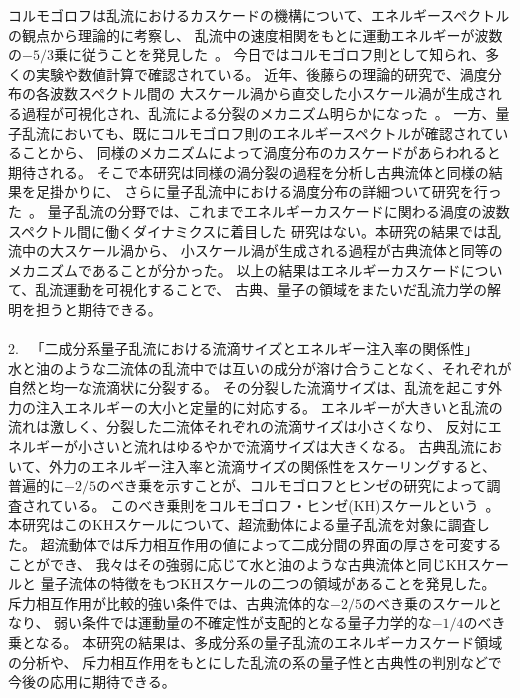 \documentclass[12pt,a4paper]{jbook}
\begin{document}
	コルモゴロフは乱流におけるカスケードの機構について、エネルギースペクトルの観点から理論的に考察し、
    乱流中の速度相関をもとに運動エネルギーが波数の$-5/3$乗に従うことを発見した~\cite{Kolmogorov}。
    今日ではコルモゴロフ則として知られ、多くの実験や数値計算で確認されている。
    近年、後藤らの理論的研究で、渦度分布の各波数スペクトル間の
	大スケール渦から直交した小スケール渦が生成される過程が可視化され、乱流による分裂のメカニズム明らかになった~\cite{Goto1, Goto2, Goto3}。
	一方、量子乱流においても、既にコルモゴロフ則のエネルギースペクトルが確認されていることから、
	同様のメカニズムによって渦度分布のカスケードがあらわれると期待される。
	そこで本研究は同様の渦分裂の過程を分析し古典流体と同様の結果を足掛かりに、
	さらに量子乱流中における渦度分布の詳細ついて研究を行った~\cite{paper1}。
	量子乱流の分野では、これまでエネルギーカスケードに関わる渦度の波数スペクトル間に働くダイナミクスに着目した
	研究はない。本研究の結果では乱流中の大スケール渦から、
	小スケール渦が生成される過程が古典流体と同等のメカニズムであることが分かった。
    以上の結果はエネルギーカスケードについて、乱流運動を可視化することで、
    古典、量子の領域をまたいだ乱流力学の解明を担うと期待できる。
    \\
    \\
	2. \ 「二成分系量子乱流における流滴サイズとエネルギー注入率の関係性」
    \\
    水と油のような二流体の乱流中では互いの成分が溶け合うことなく、それぞれが自然と均一な流滴状に分裂する。
    その分裂した流滴サイズは、乱流を起こす外力の注入エネルギーの大小と定量的に対応する。
    エネルギーが大きいと乱流の流れは激しく、分裂した二流体それぞれの流滴サイズは小さくなり、
    反対にエネルギーが小さいと流れはゆるやかで流滴サイズは大きくなる。
	古典乱流において、外力のエネルギー注入率と流滴サイズの関係性をスケーリングすると、
    普遍的に$-2/5$のべき乗を示すことが、コルモゴロフとヒンゼの研究によって調査されている。
	このべき乗則をコルモゴロフ・ヒンゼ(KH)スケールという~\cite{Kolmogorov49, Hinze}。
	本研究はこのKHスケールについて、超流動体による量子乱流を対象に調査した。
	超流動体では斥力相互作用の値によって二成分間の界面の厚さを可変することができ、
    我々はその強弱に応じて水と油のような古典流体と同じKHスケールと
	量子流体の特徴をもつKHスケールの二つの領域があることを発見した。
	斥力相互作用が比較的強い条件では、古典流体的な$-2/5$のべき乗のスケールとなり、
	弱い条件では運動量の不確定性が支配的となる量子力学的な$-1/4$のべき乗となる。
    本研究の結果は、多成分系の量子乱流のエネルギーカスケード領域の分析や、
	斥力相互作用をもとにした乱流の系の量子性と古典性の判別などで今後の応用に期待できる。
    \\
\end{document}
